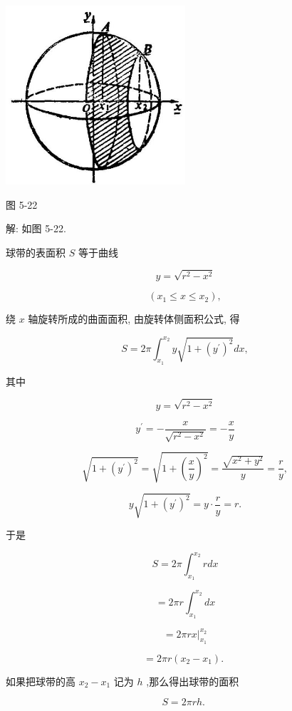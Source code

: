 \documentclass[lang=cn,newtx,12pt,scheme=chinese]{elegantbook}
\begin{document}
\begin{center}
\includegraphics[max width=0.5\textwidth]{images/01912c18-5c3f-733d-b775-749ba9897a9d_245_758349.jpg}
\end{center}

图 5-22

解: 如图 5-22.

球带的表面积 \(S\) 等于曲线

\[
y = \sqrt{{r}^{2} - {x}^{2}}
\]

\[
\left( {{x}_{1} \leq x \leq {x}_{2}}\right) ,
\]

绕 \(x\) 轴旋转所成的曲面面积, 由旋转体侧面积公式, 得

\[
S = {2\pi }{\int }_{{x}_{1}}^{{x}_{2}}y\sqrt{1 + {\left( {y}^{\prime }\right) }^{2}}{dx},
\]

其中

\[
y = \sqrt{{r}^{2} - {x}^{2}}
\]

\[
{y}^{\prime } = - \frac{x}{\sqrt{{r}^{2} - {x}^{2}}} = - \frac{x}{y}
\]

\[
\sqrt{1 + {\left( {y}^{\prime }\right) }^{2}} = \sqrt{1 + {\left( \frac{x}{y}\right) }^{2}} = \frac{\sqrt{{x}^{2} + {y}^{2}}}{y} = \frac{r}{y},
\]

\[
y\sqrt{1 + {\left( {y}^{\prime }\right) }^{2}} = y \cdot \frac{r}{y} = r.
\]

于是

\[
S = {2\pi }{\int }_{{x}_{1}}^{{x}_{2}}{rdx}
\]

\[
= {2\pi r}{\int }_{{x}_{1}}^{{x}_{2}}{dx}
\]

\[
= {\left. 2\pi rx\right| }_{{x}_{1}}^{{x}_{2}}
\]

\[
= {2\pi r}\left( {{x}_{2} - {x}_{1}}\right) \text{. }
\]

如果把球带的高 \({x}_{2} - {x}_{1}\) 记为 \(h\) ,那么得出球带的面积

\[
S = {2\pi rh}\text{. }
\]
\end{document}
